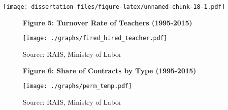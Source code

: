 \documentclass[12pt,]{book}
\newenvironment{Shaded}{\begin{snugshade}}{\end{snugshade}}
\newcommand{\DataTypeTok}[1]{\textcolor[rgb]{0.13,0.29,0.53}{#1}}
\newcommand{\DecValTok}[1]{\textcolor[rgb]{0.00,0.00,0.81}{#1}}
\newcommand{\KeywordTok}[1]{\textcolor[rgb]{0.13,0.29,0.53}{\textbf{#1}}}
\newcommand{\NormalTok}[1]{#1}
\newcommand{\OperatorTok}[1]{\textcolor[rgb]{0.81,0.36,0.00}{\textbf{#1}}}
\newcommand{\StringTok}[1]{\textcolor[rgb]{0.31,0.60,0.02}{#1}}
\begin{document}
\begin{Shaded}
\end{Shaded}

\texttt{[image: dissertation\_files/figure-latex/unnamed-chunk-18-1.pdf]}

\begin{figure}
    \centering
    \textbf{\small Figure 5: Turnover Rate of Teachers (1995-2015)}\par\medskip
    \texttt{[image: ./graphs/fired\_hired\_teacher.pdf]}
    \caption*{\footnotesize \hfill Source: RAIS, Ministry of Labor}
\end{figure}

\begin{figure}
    \centering
    \textbf{\small Figure 6: Share of Contracts by Type (1995-2015)}\par\medskip
    \texttt{[image: ./graphs/perm\_temp.pdf]}
    \caption*{\footnotesize \hfill Source: RAIS, Ministry of Labor}
\end{figure}
\end{document}
